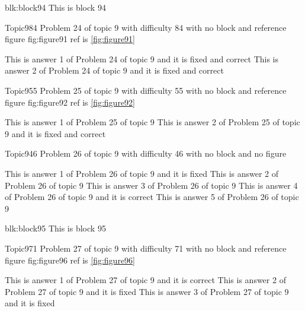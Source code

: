 \documentclass[master]{exam}
\begin{document}
\begin{block}{blk:block94}
This is block 94
\end{block}


\begin{problem}{Topic9}{84}
	Problem 24 of topic 9 with difficulty 84 with no block and reference figure fig:figure91 ref is \ref{fig:figure91}
	\begin{answers}
		 This is answer 1 of Problem 24 of topic 9 and it is fixed and correct
		 This is answer 2 of Problem 24 of topic 9 and it is fixed and correct
	\end{answers}
\end{problem}

\begin{problem}{Topic9}{55}
	Problem 25 of topic 9 with difficulty 55 with no block and reference figure fig:figure92 ref is \ref{fig:figure92}
	\begin{answers}
		\answer This is answer 1 of Problem 25 of topic 9 
		 This is answer 2 of Problem 25 of topic 9 and it is fixed and correct
	\end{answers}
\end{problem}

\begin{problem}{Topic9}{46}
	Problem 26 of topic 9 with difficulty 46 with no block and no figure
	\begin{answers}
		\answer[fixed] This is answer 1 of Problem 26 of topic 9 and it is fixed
		\answer This is answer 2 of Problem 26 of topic 9 
		\answer This is answer 3 of Problem 26 of topic 9 
		\answer[correct] This is answer 4 of Problem 26 of topic 9 and it is correct
		\answer This is answer 5 of Problem 26 of topic 9 
	\end{answers}
\end{problem}



\begin{block}{blk:block95}
This is block 95
\end{block}


\begin{problem}{Topic9}{71}
	Problem 27 of topic 9 with difficulty 71 with no block and reference figure fig:figure96 ref is \ref{fig:figure96}
	\begin{answers}
		\answer[correct] This is answer 1 of Problem 27 of topic 9 and it is correct
		\answer[fixed] This is answer 2 of Problem 27 of topic 9 and it is fixed
		\answer[fixed] This is answer 3 of Problem 27 of topic 9 and it is fixed
	\end{answers}
\end{problem}
\end{document}
